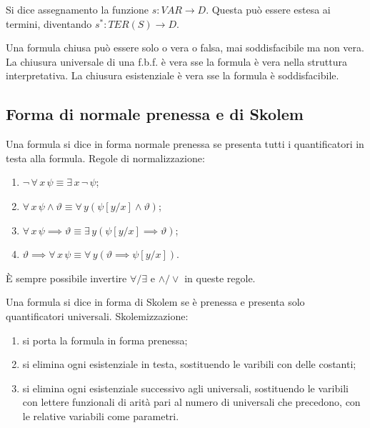 \documentclass[10pt]{article}
\begin{document}
            Si dice assegnamento la funzione \(s : VAR \to D\). Questa può essere estesa ai termini, diventando \(s^* : TER(S) \to D\).

            Una formula chiusa può essere solo o vera o falsa, mai soddisfacibile ma non vera. La chiusura universale di una f.b.f. è
            vera sse la formula è vera nella struttura interpretativa. La chiusura esistenziale è vera sse la formula è soddisfacibile.

        \subsection*{Forma di normale prenessa e di Skolem}

            Una formula si dice in forma normale prenessa se presenta tutti i quantificatori in testa alla formula. Regole di
            normalizzazione:
            \begin{enumerate}
                \item \(\neg \, \forall \, x \, \psi \equiv \exists \, x \, \neg \, \psi\);
                \item \(\forall \, x \, \psi \land \vartheta \equiv \forall \, y \left(\psi [y/x] \land \vartheta\right)\);
                \item \(\forall \, x \, \psi \implies \vartheta \equiv \exists \, y \left(\psi [y/x] \implies \vartheta\right)\);
                \item \(\vartheta \implies \forall \, x \, \psi \equiv \forall \, y \left(\vartheta \implies \psi [y/x]\right)\).
            \end{enumerate}
            È sempre possibile invertire \(\forall/\exists\) e \(\land/\lor\) in queste regole.
            
            Una formula si dice
            in forma di Skolem se è prenessa e presenta solo quantificatori universali. Skolemizzazione:
            \begin{enumerate}
                \item si porta la formula in forma prenessa;
                \item si elimina ogni esistenziale in testa, sostituendo le varibili con delle costanti;
                \item si elimina ogni esistenziale successivo agli universali, sostituendo le varibili con lettere funzionali di
                    arità pari al numero di universali che precedono, con le relative variabili come parametri.
            \end{enumerate}
\end{document}
